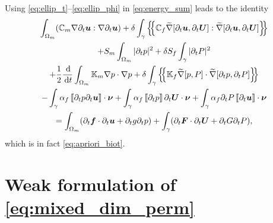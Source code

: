 \documentclass[a4paper]{article}
\def\agrad{\widetilde\nabla}
\def\avg#1{\left\{\mskip-5mu\left\{#1\right\}\mskip-5mu\right\}}
\def\CC{\tn C}
\def\d {\,{\rm d}}
\def\ddt#1{\frac{\d #1}{\d t}}
\def\dt{\prtl_t}
\def\FF{\vc F}
\def\ff{\vc f}
\def\jmp#1{\left\llbracket #1 \right\rrbracket}
\def\nnu{\vc\nu}
\def\prtl{\partial}
\def\tn#1{{\mathbb{#1}}}    %
\def\U{\vc U}
\def\uu{\vc u}
\def\vc#1{\mathbf{\boldsymbol{#1}}}     %
\newcommand{\mls}[1]{\begin{multline*}#1\end{multline*}}
\begin{document}
Using \eqref{eq:ellip_t}--\eqref{eq:ellip_phi} in \eqref{eq:energy_sum} leads to the identity
\mls{ \int_{\Omega_m}(\CC_m\nabla\dt\uu:\nabla\dt\uu ) + \delta\int_\gamma\avg{\CC_f\agrad[\dt\uu,\dt\U]:\agrad[\dt\uu,\dt\U]}\\
+ S_m\int_{\Omega_m}|\dt p|^2 + \delta S_f\int_\gamma|\dt P|^2\\
+ \frac12\ddt{}\int_{\Omega_m}\tn K_m\nabla p\cdot\nabla p
+ \delta\int_\gamma\avg{\tn K_f\agrad[p,P]\cdot\agrad[\dt p,\dt P]} \\
- \int_\gamma\alpha_f\jmp{\dt p \dt\uu}\cdot\nnu
+ \int_\gamma\alpha_f\jmp{\dt p}\dt\U\cdot\nnu
+ \int_\gamma\alpha_f\dt P\jmp{\dt\uu}\cdot\nnu\\
= \int_{\Omega_m}(\dt\ff\cdot\dt\uu + \dt g \dt p) + \int_\gamma(\dt\FF\cdot\dt\U + \dt G \dt P), }
which is in fact \eqref{eq:apriori_biot}.



\section{Weak formulation of \eqref{eq:mixed_dim_perm}}\label{sec:app_weak_form}
\end{document}
